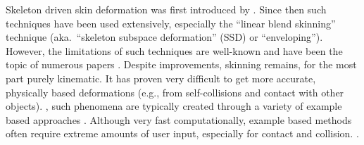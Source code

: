 



Skeleton driven skin deformation was first introduced by \cite{Magnenat-Thalmann89}. Since then such techniques have been used extensively, especially the ``linear blend skinning'' technique
(aka.\ ``skeleton subspace deformation'' (SSD) or ``enveloping''). However, the limitations of such techniques are well-known and have been the topic of numerous papers
\cite{Wang02,Merry06,Kavan08}. Despite improvements, skinning remains, for the most part purely kinematic. It has proven very difficult to get more accurate, physically based deformations
(e.g., from self-collisions and contact with other objects). , such phenomena are typically created through a variety of example based approaches
\cite{Lewis00,Sloan01}. Although very fast computationally, example based methods often require extreme amounts of user input, especially for contact and collision. .

